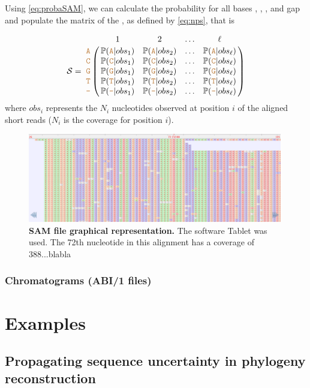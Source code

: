 \documentclass[10pt]{article}
\begin{document}
Using \autoref{eq:probaSAM}, we can calculate the probability for all bases , , ,  and gap \sq{-} and populate the matrix of the \nlps, as defined by \autoref{eq:nps}, that is


\begin{equation}
\nps = \bordermatrix{   & 1 & 2 & \ldots & \ell \cr
                \sq{A} & \pr{\sq{A} | obs_1} & \pr{\sq{A} | obs_2} & \ldots & \pr{\sq{A} | obs_\ell} \cr
                \sq{C} & \pr{\sq{C} | obs_1} & \pr{\sq{C} | obs_2} & \ldots & \pr{\sq{C} | obs_\ell} \cr
                \sq{G} & \pr{\sq{G} | obs_1} & \pr{\sq{G} | obs_2} & \ldots & \pr{\sq{G} | obs_\ell} \cr
                \sq{T} & \pr{\sq{T} | obs_1} & \pr{\sq{T} | obs_2} & \ldots & \pr{\sq{T} | obs_\ell} \cr 
                \sq{-} & \pr{\sq{-} | obs_1} & \pr{\sq{-} | obs_2} & \ldots & \pr{\sq{-} | obs_\ell} \cr 
}\label{eq:npsSAM}
\end{equation}
where $obs_i$ represents the $N_i$ nucleotides observed at position $i$ of the aligned short reads (\ie $N_i$ is the coverage for position $i$).


\begin{figure}[ht]
\centering
    \includegraphics[width=0.99\textwidth]{figs/sam-tablet.png}
\caption{\textbf{SAM file graphical representation.} The software Tablet  was used. The 72th nucleotide in this alignment has a coverage of 388...blabla}
\label{fig:sam}
\end{figure}


\subsubsection{Chromatograms (ABI/1 files)}



\newpage

\section{Examples}
\subsection{Propagating sequence uncertainty in phylogeny reconstruction}
\end{document}

